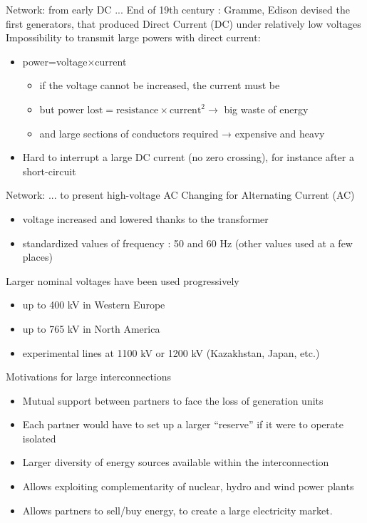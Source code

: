 \begin{frame}
{Network: from early DC ...}
End of 19th century : Gramme, Edison devised the first generators, that produced Direct Current (DC) under relatively low voltages
Impossibility to transmit large powers with direct current:
\begin{itemize}
\item power=voltage×current
\begin{itemize}
\item if the voltage cannot be increased, the current must be
\item but $\text{power lost} = \text{resistance} \times \text{current}^2 \rightarrow$ big waste of energy
\item and large sections of conductors required → expensive and heavy
\end{itemize}
\item Hard to interrupt a large DC current (no zero crossing), for instance after a short-circuit
\end{itemize}
\end{frame}

\begin{frame}
{Network: ... to present high-voltage AC}
Changing for Alternating Current (AC)
\begin{itemize}
\item voltage increased and lowered thanks to the transformer
\item standardized values of frequency : 50 and 60 Hz (other values used at a few places)
\end{itemize}
Larger nominal voltages have been used progressively
\begin{itemize}
\item up to 400 kV in Western Europe
\item up to 765 kV in North America
\item experimental lines at 1100 kV or 1200 kV (Kazakhstan, Japan, etc.)
\end{itemize}
\end{frame}

\begin{frame}
{Motivations for large interconnections}
\begin{itemize}
\item Mutual support between partners to face the loss of generation units
\item Each partner would have to set up a larger “reserve” if it were to operate isolated
\item Larger diversity of energy sources available within the interconnection
\item Allows exploiting complementarity of nuclear, hydro and wind power plants
\item Allows partners to sell/buy energy, to create a large electricity market.
\end{itemize}
\end{frame}

